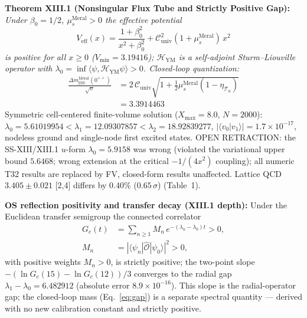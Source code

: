 \documentclass[reprint,aps,pre,twocolumn,notitlepage]{revtex4-2}
\begin{document}
\textbf{Theorem XIII.1 (Nonsingular Flux Tube and Strictly Positive Gap):}
\textit{Under $\beta_0=1/2$, $\mu_s^{\mathrm{Meral}}>0$ the effective potential}
\begin{equation}
\label{eq:veff}
\boxed{V_{\mathrm{eff}}(x)=\frac{1+\beta_0^2}{x^2+\beta_0^2}
+\mathcal{C}_{\mathrm{univ}}^2(1+\mu_s^{\mathrm{Meral}})\,x^2}
\end{equation}
\textit{is positive for all $x\ge 0$ ($V_{\min}=3.19416$); $\mathcal{H}_{\mathrm{YM}}$
is a self-adjoint Sturm--Liouville operator with
$\lambda_0=\inf\langle\psi,\mathcal{H}_{\mathrm{YM}}\psi\rangle>0$.
Closed-loop quantization:}
\begin{equation}
\label{eq:gap}
\boxed{\begin{aligned}
\frac{\Delta m_{\mathrm{gap}}^{\mathrm{Meral}}(0^{++})}{\sqrt{\sigma}}
&=2\,\mathcal{C}_{\mathrm{univ}}\sqrt{1+\tfrac{1}{2}\mu_s^{\mathrm{Meral}}
(1-\eta_{\mathcal{T}_0})}\\
&=3.3914463
\end{aligned}}
\end{equation}
Symmetric cell-centered finite-volume solution ($X_{\max}=8.0$, $N=2000$):
$\lambda_0=5.61019954<\lambda_1=12.09307857<\lambda_2=18.92839277$,
$|\langle v_0|v_1\rangle|=1.7\times 10^{-17}$, nodeless ground and
single-node first excited states. OPEN RETRACTION: the SS-XIII/XIII.1
$u$-form $\lambda_0=5.9158$ was wrong (violated the variational upper bound
$5.6468$; wrong extension at the critical $-1/(4x^2)$ coupling); all numeric
T32 results are replaced by FV, closed-form results unaffected.
Lattice QCD $3.405\pm 0.021$ [2,4] differs by 0.40\% ($0.65\,\sigma$) (Table~1).

\textbf{OS reflection positivity and transfer decay (XIII.1 depth):}
Under the Euclidean transfer semigroup the connected correlator
\begin{equation*}
\begin{split}
G_c(t) &=\sum_{n\ge 1} M_n\,e^{-(\lambda_n-\lambda_0)t}>0,\\
M_n &=|\langle\psi_n|\hat{\mathcal{O}}|\psi_0\rangle|^2>0,
\end{split}
\end{equation*}
with positive weights $M_n>0$,
is strictly positive; the two-point slope
$-(\ln G_c(15)-\ln G_c(12))/3$ converges to the radial gap
$\lambda_1-\lambda_0=6.482912$ (absolute error $8.9\times 10^{-16}$).
This slope is the radial-operator gap; the closed-loop mass (Eq.~\ref{eq:gap})
is a separate spectral quantity --- derived with no new calibration constant and strictly positive.
\end{document}
